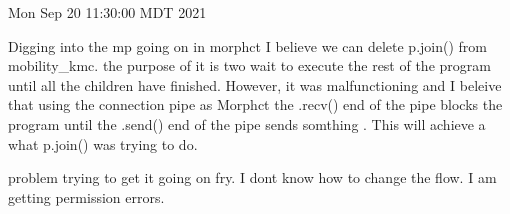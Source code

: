 Mon Sep 20 11:30:00 MDT 2021
    
    Digging into the mp going on in morphct I believe we can delete p.join() from 
    mobility_kmc. the purpose of it is two wait to execute the rest of the program
    until all the children have finished. However, it was malfunctioning and I beleive
    that using the connection pipe as Morphct the .recv() end of the pipe blocks the
    program until the .send() end of the pipe sends somthing . This will achieve 
    a what p.join() was trying to do. 

    problem trying to get it going on fry. I dont know how to change the flow. 
    I am getting permission errors. 
